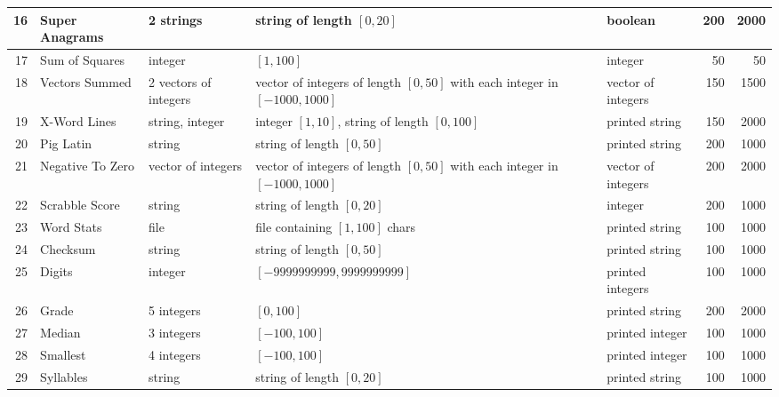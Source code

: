 \documentclass{sig-alternate}
\begin{document}
\begin{table*}[t]
\begin{tabular}{|r >{\raggedright}p{2.6cm} | >{\raggedright}p{2cm} >{\raggedright}p{5.5cm} >{\raggedright}p{2.5cm} rr|}
\hline
16 & Super Anagrams & 2 strings & string of length $[0, 20]$ & boolean & 200 & 2000 \\
\hline
17 & Sum of Squares & integer & $[1, 100]$ & integer & 50 & 50 \\
\hline
18 & Vectors Summed & 2 vectors of integers & vector of integers of length $[0,50]$ with each integer in $[-1000, 1000]$ & vector of integers & 150 & 1500 \\
\hline
19 & X-Word Lines & string, integer & integer $[1, 10]$, string of length $[0, 100]$ & printed string & 150 & 2000 \\
\hline
20 & Pig Latin & string & string of length $[0, 50]$ & printed string & 200 & 1000 \\
\hline
21 & Negative To Zero & vector of integers & vector of integers of length $[0,50]$ with each integer in $[-1000, 1000]$ & vector of integers & 200 & 2000 \\
\hline
22 & Scrabble Score & string & string of length $[0, 20]$ & integer & 200 & 1000 \\
\hline
23 & Word Stats & file & file containing $[1, 100]$ chars & printed string & 100 & 1000 \\
\hline
24 & Checksum & string & string of length $[0, 50]$ & printed string & 100 & 1000 \\
\hline
25 & Digits & integer & $[-9999999999, 9999999999]$ & printed integers & 100 & 1000 \\
\hline
26 & Grade & 5 integers & $[0, 100]$ & printed string & 200 & 2000 \\
\hline
27 & Median & 3 integers & $[-100, 100]$ & printed integer & 100 & 1000 \\
\hline
28 & Smallest & 4 integers & $[-100, 100]$ & printed integer & 100 & 1000 \\
\hline
29 & Syllables & string & string of length $[0, 20]$ & printed string & 100 & 1000\\
\hline
\end{tabular}
\end{table*}
\end{document}
